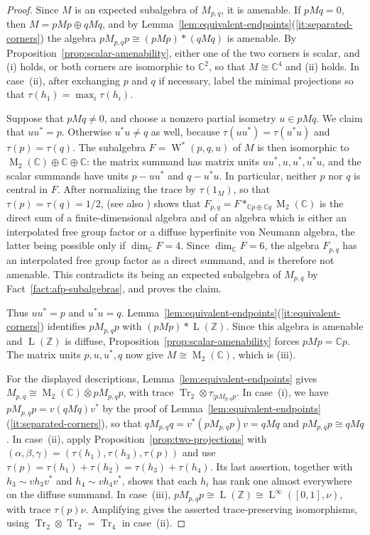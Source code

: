 \documentclass[11pt]{amsart}
\numberwithin{equation}{section}
\newcommand{\zz}{\mathbb Z}
\newcommand{\cc}{\mathbb C}
\newcommand{\pt}{\otimes}
\newcommand{\ovt}{\mathbin{\overline{\otimes}}}
\DeclareMathOperator{\LL}{L}
\DeclareMathOperator{\Tr}{Tr}
\newcommand{\Wstar}{\operatorname{W}^*}
\newcommand{\rL}{\operatorname{L}}
\newcommand{\rM}{\operatorname{M}}
\theoremstyle{definition}
\begin{document}
\begin{proof}
    Since $M$ is an expected subalgebra of $M_{p,q}$, it is amenable. If $pMq=0$, then $M=pMp\oplus qMq$, and by Lemma~\ref{lem:equivalent-endpoints}\textup{(\ref*{it:separated-corners})} the algebra $pM_{p,q}p\cong(pMp)\ast(qMq)$ is amenable. By Proposition~\ref{prop:scalar-amenability}, either one of the two corners is scalar, and \textup{(i)} holds, or both corners are isomorphic to $\cc^2$, so that $M\cong\cc^4$ and \textup{(ii)} holds. In case~\textup{(ii)}, after exchanging $p$ and $q$ if necessary, label the minimal projections so that $\tau(h_1)=\max_i\tau(h_i)$.

    Suppose that $pMq\ne0$, and choose a nonzero partial isometry $u\in pMq$. We claim that $uu^*=p$. Otherwise $u^*u\ne q$ as well, because $\tau(uu^*)=\tau(u^*u)$ and $\tau(p)=\tau(q)$. The subalgebra $F=\Wstar(p,q,u)$ of $M$ is then isomorphic to $\rM_2(\cc)\oplus\cc\oplus\cc$: the matrix summand has matrix units $uu^*,u,u^*,u^*u$, and the scalar summands have units $p-uu^*$ and $q-u^*u$. In particular, neither $p$ nor $q$ is central in $F$. After normalizing the trace by $\tau(1_M)$, so that $\tau(p)=\tau(q)=1/2$, \cite[Lemma~4.2]{Dy95} (see also \cite[Lemma~2.5]{Re13}) shows that $F_{p,q}=F\ast_{\cc p\oplus\cc q}\rM_2(\cc)$ is the direct sum of a finite-dimensional algebra and of an algebra which is either an interpolated free group factor or a diffuse hyperfinite von Neumann algebra, the latter being possible only if $\dim_{\cc}F=4$. Since $\dim_{\cc}F=6$, the algebra $F_{p,q}$ has an interpolated free group factor as a direct summand, and is therefore not amenable. This contradicts its being an expected subalgebra of $M_{p,q}$ by Fact~\ref{fact:afp-subalgebras}, and proves the claim.

    Thus $uu^*=p$ and $u^*u=q$. Lemma~\ref{lem:equivalent-endpoints}\textup{(\ref*{it:equivalent-corners})} identifies $pM_{p,q}p$ with $(pMp)\ast\LL(\zz)$. Since this algebra is amenable and $\LL(\zz)$ is diffuse, Proposition~\ref{prop:scalar-amenability} forces $pMp=\cc p$. The matrix units $p,u,u^*,q$ now give $M\cong\rM_2(\cc)$, which is \textup{(iii)}.


For the displayed descriptions, Lemma~\ref{lem:equivalent-endpoints} gives $M_{p,q}\cong\rM_2(\cc)\ovt pM_{p,q}p$, with trace $\Tr_2\pt\tau_{\mid pM_{p,q}p}$. In case~\textup{(i)}, we have $pM_{p,q}p=v(qMq)v^*$ by the proof of Lemma~\ref{lem:equivalent-endpoints}\textup{(\ref*{it:separated-corners})}, so that $qM_{p,q}q=v^*(pM_{p,q}p)v=qMq$ and $pM_{p,q}p\cong qMq$. In case~\textup{(ii)}, apply Proposition~\ref{prop:two-projections} with $(\alpha,\beta,\gamma)=(\tau(h_1),\tau(h_3),\tau(p))$ and use $\tau(p)=\tau(h_1)+\tau(h_2){}=\tau(h_3)+\tau(h_4)$. Its last assertion, together with $h_3\sim vh_3v^*$ and $h_4\sim vh_4v^*$, shows that each $h_i$ has rank one almost everywhere on the diffuse summand. In case~\textup{(iii)}, $pM_{p,q}p\cong\LL(\zz)\cong\rL^\infty([0,1],\nu)$, with trace $\tau(p)\nu$. Amplifying gives the asserted trace-preserving isomorphisms, using $\Tr_2\pt\Tr_2=\Tr_4$ in case~\textup{(ii)}.
\end{proof}
\end{document}
